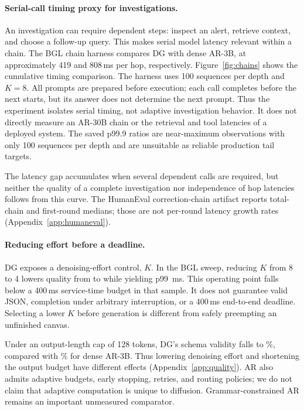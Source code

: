 \paragraph{Serial-call timing proxy for investigations.}
An investigation can require dependent steps: inspect an alert, retrieve
context, and choose a follow-up query. This makes serial model latency
relevant within a chain. The BGL chain harness compares DG with dense
AR-3B, at approximately 419 and 808\,ms per hop, respectively.
Figure~\ref{fig:chains} shows the cumulative timing comparison.
The harness uses 100
sequences per depth and $K=8$. All prompts are prepared before execution;
each call completes before the next starts, but its answer does not
determine the next prompt. Thus the experiment isolates serial timing,
not adaptive investigation behavior. It does not directly measure an
AR-30B chain or the retrieval and tool latencies of a deployed system.
The saved p99.9 ratios are near-maximum observations with only 100
sequences per depth and are unsuitable as reliable production tail targets.

The latency gap accumulates when several dependent calls are required,
but neither the quality of a complete investigation nor independence of
hop latencies follows from this curve. The HumanEval correction-chain
artifact reports total-chain and first-round medians; those are not
per-round latency growth rates (Appendix~\ref{app:humaneval}).

\paragraph{Reducing effort before a deadline.}
DG exposes a denoising-effort control, $K$. In the BGL sweep, reducing
$K$ from 8 to 4 lowers quality from \kEightFone{} to \kFourFone{}
while yielding p99 \kFourPninetynine\,ms. This operating point
falls below a 400\,ms service-time budget in that sample. It does not
guarantee valid JSON, completion under arbitrary interruption, or a
400\,ms end-to-end deadline. Selecting a lower $K$ before generation
is different from safely preempting an unfinished canvas.

Under an output-length cap of 128 tokens, DG's schema validity falls to
\dgValidTwentyEight\%, compared with \arValidTwentyEight\% for
dense AR-3B. Thus lowering denoising effort and shortening the output
budget have different effects (Appendix~\ref{app:quality}). AR also
admits adaptive budgets, early stopping, retries, and routing policies;
we do not claim that adaptive computation is unique to diffusion.
Grammar-constrained AR remains an important unmeasured comparator.

